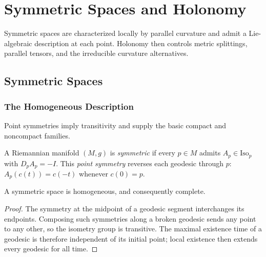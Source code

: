 \chapter{Symmetric Spaces and Holonomy}
\label{chap:pet-symmetric-spaces-and-holonomy}

Symmetric spaces are characterized locally by parallel curvature and admit a
Lie-algebraic description at each point. Holonomy then controls metric
splittings, parallel tensors, and the irreducible curvature alternatives.

\section{Symmetric Spaces}

\subsection{The Homogeneous Description}

Point symmetries imply transitivity and supply the basic compact and
noncompact families.

\begin{definition}
  \label{def:pet-ch10-symmetric-space}

  A Riemannian manifold $(M,g)$ is \emph{symmetric} if every $p\in M$ admits
  $A_p\in\mathrm{Iso}_p$ with $D_pA_p=-I$. This \emph{point symmetry} reverses
  each geodesic through $p$:
  $A_p(c(t))=c(-t)$ whenever $c(0)=p$.
\end{definition}

\begin{proposition}
  \label{prop:pet-ch10-symmetric-homogeneous}

  A symmetric space is homogeneous, and consequently complete.
\end{proposition}
\begin{proof}
  \sketch
  The symmetry at the midpoint of a geodesic segment interchanges its
  endpoints. Composing such symmetries along a broken geodesic sends any point
  to any other, so the isometry group is transitive. The maximal existence
  time of a geodesic is therefore independent of its initial point; local
  existence then extends every geodesic for all time.
\end{proof}

